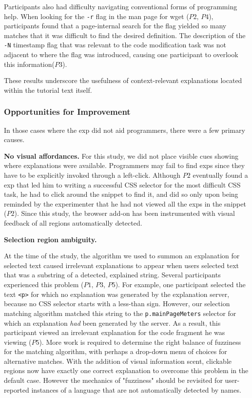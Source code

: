 Participants also had difficulty navigating conventional forms of programming help.
When looking for the \texttt{-r} flag in the man page for wget ($P2$, $P4$), participants found that a page-internal  search for the flag yielded so many matches that it was difficult to find the desired definition.
The description of the \texttt{-N} timestamp flag that was relevant to the code modification task was not adjacent to where the flag was introduced, causing one participant to overlook this information($P3$).

These results underscore the usefulness of context-relevant explanations located within the tutorial text itself.

\subsubsection{Opportunities for Improvement}
In those cases where the \gls{exp} did not aid programmers, there were a few primary causes.

{\bf No visual affordances.} For this study, we did not place  visible cues showing where explanations were available.
Programmers may fail to find \glspl{exp} since they have to be explicitly invoked through a left-click.
Although $P2$ eventually found a \gls{exp} that led him to writing a successful CSS selector for the most difficult CSS task, he had to click around the snippet to find it, and did so only upon being reminded by the experimenter that he had not viewed all the \glspl{exp} in the snippet ($P2$).
\fi
Since this study, the browser add-on has been instrumented with visual feedback of all regions automatically detected.

{\bf Selection region ambiguity.}
\begin{changes}
At the time of the study, the algorithm we used to summon an explanation for selected text caused irrelevant explanations to appear when users selected text that was a substring of a detected, explained string.
Several participants experienced this problem ($P1$, $P3$, $P5$).
For example, one participant selected the text \texttt{<p>} for which no explanation was generated by the explanation server, because no CSS selector starts with a less-than sign.
However, our selection matching algorithm matched this string to the \texttt{p.mainPageMeters} selector for which an explanation \emph{had} been generated by the server.
As a result, this participant viewed an irrelevant explanation for the code fragment he was viewing ($P5$).
More work is required to determine the right balance of fuzziness for the matching algorithm, with perhaps a drop-down menu of choices for alternative matches.
\fi
With the addition of visual information scent, clickable regions now have exactly one correct explanation to overcome this problem in the default case.
However the mechanics of "fuzziness" should be revisited for user-reported instances of a language that are not automatically detected by \Glspl{name}.
\end{changes}

